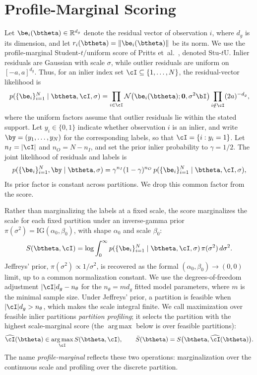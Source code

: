 \documentclass[runningheads]{llncs}
\DeclareMathOperator*{\argmax}{arg\,max}
\newcommand{\bzero}{\mathbf{0}}
\newcommand{\NN}{\mathcal{N}}
\newcommand{\Reals}{\mathbb{R}}
\newcommand{\IG}{\mathrm{IG}}
\newcommand{\stuU}{Stu-$t$U}          %
\begin{document}
\section{Profile-Marginal Scoring}
\label{sec:scale-free}
Let $\be_i(\btheta)\in\Reals^{d_g}$ denote the residual vector of
observation $i$, where $d_g$ is its dimension, and let
$r_i(\btheta)=\|\be_i(\btheta)\|$ be its norm.
We use the profile-marginal Student-$t$/uniform score of
Pritts et~al.~\cite{PrittsScoring2026}, denoted \stuU{}.
Inlier residuals are Gaussian with scale $\sigma$, while outlier
residuals are uniform on $[-a,a]^{d_g}$. Thus, for an inlier
index set $\cI\subseteq\{1,\ldots,N\}$, the residual-vector
likelihood is
\begin{equation}
	p(\{\be_i\}_{i=1}^N\mid\btheta,\cI,\sigma)
	=\prod_{i\in\cI}\NN\bigl(\be_i(\btheta);\bzero,\sigma^2\bI\bigr)
	\prod_{i\notin\cI}(2a)^{-d_g},
	\label{eq:partition-likelihood}
\end{equation}
where the uniform factors assume that outlier residuals lie
within the stated support.
Let $y_i\in\{0,1\}$ indicate whether observation $i$ is an
inlier, and write $\by=(y_1,\ldots,y_N)$ for the corresponding
labels, so that $\cI=\{i:y_i=1\}$. Let $n_I=|\cI|$ and
$n_O=N-n_I$, and set the prior inlier probability to $\gamma=1/2$.
The joint likelihood of residuals and labels is
\begin{equation}
	p(\{\be_i\}_{i=1}^N,\by\mid\btheta,\sigma)
	=\gamma^{n_I}(1-\gamma)^{n_O}\,
	p(\{\be_i\}_{i=1}^N\mid\btheta,\cI,\sigma),
	\label{eq:joint-partition}
\end{equation}
Its prior factor is constant across partitions.
We drop this common factor from the score.

Rather than marginalizing the labels at a fixed scale, the score
marginalizes the scale for each fixed partition under an
inverse-gamma prior $\pi(\sigma^2)=\IG(\alpha_0,\beta_0)$, with
shape $\alpha_0$ and scale $\beta_0$:
\begin{equation}
	S(\btheta,\cI)=\log\int_0^\infty
	p(\{\be_i\}_{i=1}^N\mid\btheta,\cI,\sigma)\,
	\pi(\sigma^2)\,d\sigma^2.
	\label{eq:score-marginal}
\end{equation}
Jeffreys' prior, $\pi(\sigma^2)\propto1/\sigma^2$, is recovered
as the formal $(\alpha_0,\beta_0)\to(0,0)$ limit, up to a
common normalization constant. We use the degrees-of-freedom adjustment
$|\cI|d_g-n_\theta$ for the $n_\theta=md_g$ fitted model parameters, where
$m$ is the minimal sample size. Under Jeffreys' prior, a partition is
feasible when $|\cI|d_g>n_\theta$, which makes the scale integral finite.
We call maximization over feasible inlier partitions
\emph{partition profiling}; it selects the partition with the highest
scale-marginal score (the $\argmax$ below is over feasible partitions):
\begin{equation}
	\widehat{\cI}(\btheta)\in\argmax_{\cI}S(\btheta,\cI),
	\qquad
	\bar S(\btheta)=S\bigl(\btheta,\widehat{\cI}(\btheta)\bigr).
	\label{eq:profile-score}
\end{equation}
The name \emph{profile-marginal} reflects these two operations:
marginalization over the continuous scale and profiling over
the discrete partition.
\end{document}
